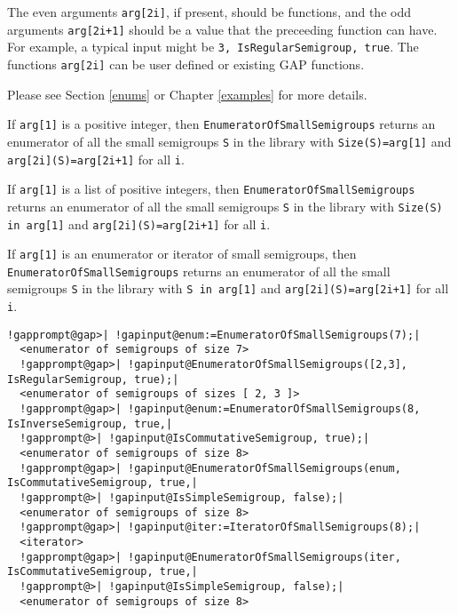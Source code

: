 \documentclass[a4paper,11pt]{report}
\begin{document}
{{{ The even arguments \texttt{arg[2i]}, if present, should be functions, and the odd arguments \texttt{arg[2i+1]} should be a value that the preceeding function can have. For example, a
typical input might be \texttt{3, IsRegularSemigroup, true}. The functions \texttt{arg[2i]} can be user defined or existing \textsf{GAP} functions.

 Please see Section \ref{enums} or Chapter \ref{examples} for more details. 

 If \texttt{arg[1]} is a positive integer, then \texttt{EnumeratorOfSmallSemigroups} returns an enumerator of all the small semigroups \texttt{S} in the library with \texttt{Size(S)=arg[1]} and \texttt{arg[2i](S)=arg[2i+1]} for all \texttt{i}. 

 If \texttt{arg[1]} is a list of positive integers, then \texttt{EnumeratorOfSmallSemigroups} returns an enumerator of all the small semigroups \texttt{S} in the library with \texttt{Size(S) in arg[1]} and \texttt{arg[2i](S)=arg[2i+1]} for all \texttt{i}. 

 If \texttt{arg[1]} is an enumerator or iterator of small semigroups, then \texttt{EnumeratorOfSmallSemigroups} returns an enumerator of all the small semigroups \texttt{S} in the library with \texttt{S in arg[1]} and \texttt{arg[2i](S)=arg[2i+1]} for all \texttt{i}. 

 
\begin{Verbatim}[commandchars=!@|,fontsize=\small,frame=single,label=Example]
  !gapprompt@gap>| !gapinput@enum:=EnumeratorOfSmallSemigroups(7);|
  <enumerator of semigroups of size 7>
  !gapprompt@gap>| !gapinput@EnumeratorOfSmallSemigroups([2,3], IsRegularSemigroup, true);|
  <enumerator of semigroups of sizes [ 2, 3 ]>
  !gapprompt@gap>| !gapinput@enum:=EnumeratorOfSmallSemigroups(8, IsInverseSemigroup, true,|
  !gapprompt@>| !gapinput@IsCommutativeSemigroup, true);|
  <enumerator of semigroups of size 8>
  !gapprompt@gap>| !gapinput@EnumeratorOfSmallSemigroups(enum, IsCommutativeSemigroup, true,|
  !gapprompt@>| !gapinput@IsSimpleSemigroup, false);|
  <enumerator of semigroups of size 8>
  !gapprompt@gap>| !gapinput@iter:=IteratorOfSmallSemigroups(8);|
  <iterator>
  !gapprompt@gap>| !gapinput@EnumeratorOfSmallSemigroups(iter, IsCommutativeSemigroup, true,|
  !gapprompt@>| !gapinput@IsSimpleSemigroup, false);|
  <enumerator of semigroups of size 8>
\end{Verbatim}
 }

 

}}
\end{document}
